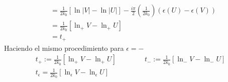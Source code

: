 \documentclass{article}
\begin{document}
{\begin{align*}
     &= \frac{1}{2k_0 } \left[\ln \left|V \right|- \ln \left|U \right|\right] - \frac{i\pi }{2} \left(\frac{1}{2k_0 }\right) \left(\epsilon(U) - \epsilon(V) \right)\\
     &= \frac{1}{2k_0 } \left[\ln_+ V - \ln_+ U \right]\\
     &= t_+
  \end{align*}
  Haciendo el mismo procedimiento para $ \epsilon= -  $ 
  \begin{gather*}
    t_+ := \frac{1}{2k_0 } \left[\ln_+ V - \ln_+ U \right] \qquad \qquad t_- := \frac{1}{2k_0 } \left[\ln_- V - \ln_- U \right]\\
    t_\epsilon = \frac{1}{2k_0 } \left[\ln_\epsilon V - \ln_\epsilon U \right]
  \end{gather*}
}
\end{document}
